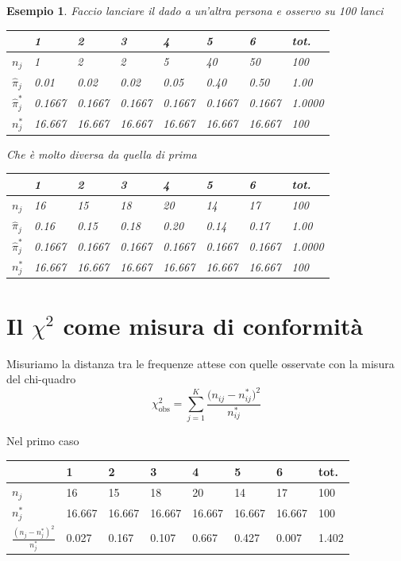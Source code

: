 \documentclass[
  11pt,
]{book}
\theoremstyle{mytheoremstyle}
\theoremstyle{mydefstyle}
\newtheorem{example}{{Esempio}}[section]
\begin{document}
\begin{example}

Faccio lanciare il dado a un'altra persona e osservo su 100 lanci

\begin{tabular}{llllllll}
\toprule
  & 1 & 2 & 3 & 4 & 5 & 6 & tot.\\
\midrule
$n_j$ & 1 & 2 & 2 & 5 & 40 & 50 & 100\\
$\hat\pi_j$ & 0.01 & 0.02 & 0.02 & 0.05 & 0.40 & 0.50 & 1.00\\
$\hat\pi_j^*$ & 0.1667 & 0.1667 & 0.1667 & 0.1667 & 0.1667 & 0.1667 & 1.0000\\
$n_j^*$ & 16.667 & 16.667 & 16.667 & 16.667 & 16.667 & 16.667 & 100\\
\bottomrule
\end{tabular}

Che è molto diversa da quella di prima

\begin{tabular}{llllllll}
\toprule
  & 1 & 2 & 3 & 4 & 5 & 6 & tot.\\
\midrule
$n_j$ & 16 & 15 & 18 & 20 & 14 & 17 & 100\\
$\hat\pi_j$ & 0.16 & 0.15 & 0.18 & 0.20 & 0.14 & 0.17 & 1.00\\
$\hat\pi_j^*$ & 0.1667 & 0.1667 & 0.1667 & 0.1667 & 0.1667 & 0.1667 & 1.0000\\
$n_j^*$ & 16.667 & 16.667 & 16.667 & 16.667 & 16.667 & 16.667 & 100\\
\bottomrule
\end{tabular}

\end{example}

\section{\texorpdfstring{Il \(\chi^2\) come misura di conformità}{Il \textbackslash chi\^{}2 come misura di conformità}}\label{il-chi2-come-misura-di-conformituxe0}

Misuriamo la distanza tra le frequenze attese con quelle osservate con la misura del chi-quadro
\[\chi^2_\text{obs}=\sum_{j=1}^K\frac{\big(n_{ij}-n_{ij}^*\big)^2}{n_{ij}^*}\]

Nel primo caso

\begin{tabular}{llllllll}
\toprule
  & 1 & 2 & 3 & 4 & 5 & 6 & tot.\\
\midrule
$n_j$ & 16 & 15 & 18 & 20 & 14 & 17 & 100\\
$n_j^*$ & 16.667 & 16.667 & 16.667 & 16.667 & 16.667 & 16.667 & 100\\
$\frac {(n_j-n_j^*)^2}{n_j^*}$ & 0.027 & 0.167 & 0.107 & 0.667 & 0.427 & 0.007 & 1.402\\
\bottomrule
\end{tabular}
\end{document}
